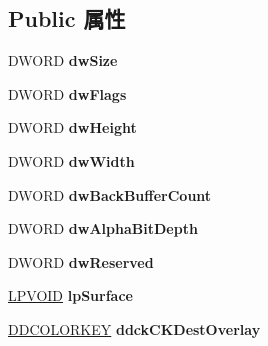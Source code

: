 \subsection*{Public 属性}
\begin{DoxyCompactItemize}
\item 
\mbox{\label{struct___d_d_s_u_r_f_a_c_e_d_e_s_c_a8d4e606a90239579cc3cbbdff835fb3b}} 
D\+W\+O\+RD {\bfseries dw\+Size}
\item 
\mbox{\label{struct___d_d_s_u_r_f_a_c_e_d_e_s_c_a8fb3e5d7367c30ff9f68b74a210885aa}} 
D\+W\+O\+RD {\bfseries dw\+Flags}
\item 
\mbox{\label{struct___d_d_s_u_r_f_a_c_e_d_e_s_c_abb490dd7b4926f024a5737c416137d02}} 
D\+W\+O\+RD {\bfseries dw\+Height}
\item 
\mbox{\label{struct___d_d_s_u_r_f_a_c_e_d_e_s_c_a93ab2070aa8f2dd44f728d9ac0a599cf}} 
D\+W\+O\+RD {\bfseries dw\+Width}
\item 
\mbox{\label{struct___d_d_s_u_r_f_a_c_e_d_e_s_c_a9a7d3561fad9e9fec145143e9fe8aa74}} 
D\+W\+O\+RD {\bfseries dw\+Back\+Buffer\+Count}
\item 
\mbox{\label{struct___d_d_s_u_r_f_a_c_e_d_e_s_c_a74ec8f2e7747a9a4d6005ced2f81fc25}} 
D\+W\+O\+RD {\bfseries dw\+Alpha\+Bit\+Depth}
\item 
\mbox{\label{struct___d_d_s_u_r_f_a_c_e_d_e_s_c_ac1da85cbef082bab876debd1c30c7c84}} 
D\+W\+O\+RD {\bfseries dw\+Reserved}
\item 
\mbox{\label{struct___d_d_s_u_r_f_a_c_e_d_e_s_c_a3f6f29fc3b6ec316c0d402b41c27e923}} 
\hyperlink{interfacevoid}{L\+P\+V\+O\+ID} {\bfseries lp\+Surface}
\item 
\mbox{\label{struct___d_d_s_u_r_f_a_c_e_d_e_s_c_aa326f8b0794743d7b3816ece01e7a7fd}} 
\hyperlink{struct_d_d_c_o_l_o_r_k_e_y}{D\+D\+C\+O\+L\+O\+R\+K\+EY} {\bfseries ddck\+C\+K\+Dest\+Overlay}

\end{DoxyCompactItemize}
